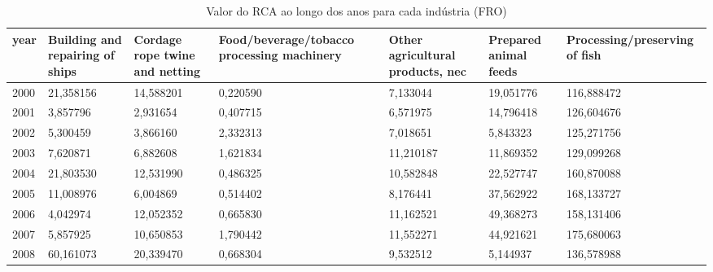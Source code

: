 \begin{table}
\centering
\caption{Valor do RCA ao longo dos anos para cada indústria (FRO)}
\begin{tabular}{p{1cm}p{2cm}p{2cm}p{2cm}p{2cm}p{2cm}p{2cm}}
\toprule
 year &  Building and repairing of ships &  Cordage rope twine and netting &  Food/beverage/tobacco processing machinery &  Other agricultural products, nec &  Prepared animal feeds &  Processing/preserving of fish \\
\midrule
 2000 &                        21,358156 &                       14,588201 &                                    0,220590 &                          7,133044 &              19,051776 &                     116,888472 \\
 2001 &                         3,857796 &                        2,931654 &                                    0,407715 &                          6,571975 &              14,796418 &                     126,604676 \\
 2002 &                         5,300459 &                        3,866160 &                                    2,332313 &                          7,018651 &               5,843323 &                     125,271756 \\
 2003 &                         7,620871 &                        6,882608 &                                    1,621834 &                         11,210187 &              11,869352 &                     129,099268 \\
 2004 &                        21,803530 &                       12,531990 &                                    0,486325 &                         10,582848 &              22,527747 &                     160,870088 \\
 2005 &                        11,008976 &                        6,004869 &                                    0,514402 &                          8,176441 &              37,562922 &                     168,133727 \\
 2006 &                         4,042974 &                       12,052352 &                                    0,665830 &                         11,162521 &              49,368273 &                     158,131406 \\
 2007 &                         5,857925 &                       10,650853 &                                    1,790442 &                         11,552271 &              44,921621 &                     175,680063 \\
 2008 &                        60,161073 &                       20,339470 &                                    0,668304 &                          9,532512 &               5,144937 &                     136,578988 \\

\end{tabular}
\end{table}
